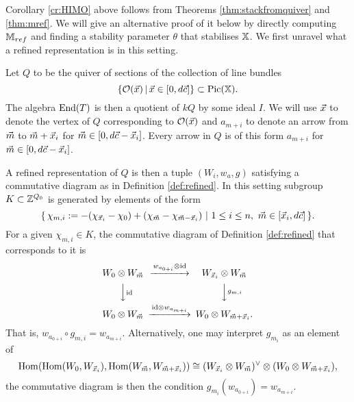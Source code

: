 \documentclass[12pt]{amsart}
\begin{document}
Corollary \ref{cr:HIMO} above follows from Theorems \ref{thm:stackfromquiver} and \ref{thm:mref}.
We will give an alternative proof of it below by directly computing $\mathbb{M}_{ref}$ and finding a stability parameter $\theta$ that stabilises $\mathbb{X}$. We first unravel what a refined representation is in this setting.

Let $Q$ to be the quiver of sections of the collection of line bundles $$\{\mathcal{O}({\vec{x}})\,|\,{\vec{x}} \in [0,d{\vec{c}}]\}\subset \operatorname{Pic}(\mathbb{X}).$$
The algebra $\operatorname{End}(T)$ is then a quotient of $kQ$ by some ideal $I$.
We will use ${\vec{x}}$ to denote the vertex of $Q$ corresponding to $\mathcal{O}({\vec{x}})$ and $a_{m+i}$ to denote an arrow from ${\vec{m}}$ to ${\vec{m}}+{\vec{x}}_i$ for ${\vec{m}} \in [0, d{\vec{c}} - {\vec{x}}_i]$. Every arrow in $Q$ is of this form $a_{m+i}$ for ${\vec{m}} \in [0, d{\vec{c}} - {\vec{x}}_i]$.


A refined representation of $Q$ is then a tuple $(W_i, w_a,g)$ satisfying a commutative diagram as in Definition \ref{def:refined}. In this setting subgroup $K \subset \mathbb{Z}^{Q_0}$ is generated by elements of the form \begin{equation}\label{eq:genK}
\{\,\chi_{m,i}:= - (\chi_{{\vec{x}}_i} - \chi_0) + (\chi_{{\vec{m}}} - \chi_{{\vec{m}}-{\vec{x}}_i})\,\, | \,\, 1\leq i\leq n,\, \, {\vec{m}}  \in [{\vec{x}}_i,d{\vec{c}}]\,\}.
\end{equation}
For a given $\chi_{m,i} \in K$, the commutative diagram of Definition \ref{def:refined} that corresponds to it is
\begin{equation}\label{CD:HIMO}
\begin{CD}
W_0 \otimes W_{\vecm} @>w_{a_{0+i}} \otimes \text{id}>> W_{\vecx_i} \otimes W_{\vecm}\\
@VV\text{id}V @VVg_{m,i}V\\
W_0 \otimes W_{\vecm} @>\text{id} \otimes w_{a_{m+i}}>> W_{0} \otimes W_{\vecm + \vecx_i}.
\end{CD}
\end{equation}
That is, $w_{a_{0+i}} \circ g_{m,i} = w_{a_{m+i}}$. Alternatively, one may interpret $g_{m_i}$ as an element of $$\operatorname{Hom}(\operatorname{Hom}(W_0, W_{{\vec{x}}_i}),\operatorname{Hom}(W_{{\vec{m}}},W_{{\vec{m}} + {\vec{x}}_i})) \cong (W_{{\vec{x}}_i} \otimes W_{{\vec{m}}})^\vee \otimes (W_{0} \otimes W_{{\vec{m}} + {\vec{x}}_i}),$$ the commutative diagram is then the condition $g_{m_i}(w_{a_{0+i}}) = w_{a_{m+i}}$.
\end{document}
